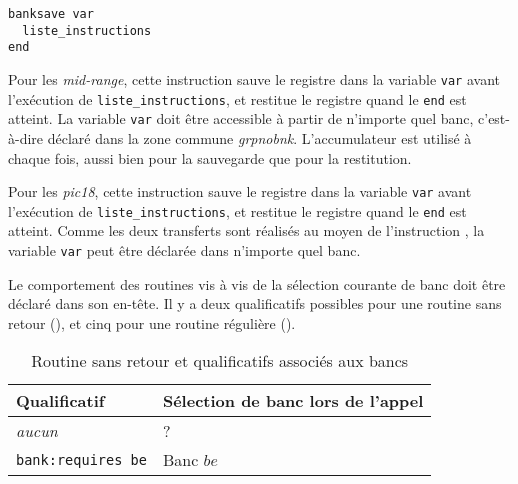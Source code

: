 
\begin{lstlisting}[language=piccolo]
banksave var
  liste_instructions
end
\end{lstlisting}

Pour les \emph{mid-range}, cette instruction sauve le registre  dans la variable \texttt{var} avant l'exécution de \texttt{liste\_instructions}, et restitue le registre  quand le \texttt{end} est atteint. La variable \texttt{var} doit être accessible à partir de n'importe quel banc, c'est-à-dire déclaré dans la zone commune \emph{grpnobnk}. L'accumulateur  est utilisé à chaque fois, aussi bien pour la sauvegarde que pour la restitution.

Pour les \emph{pic18}, cette instruction sauve le registre  dans la variable \texttt{var} avant l'exécution de \texttt{liste\_instructions}, et restitue le registre  quand le \texttt{end} est atteint. Comme les deux transferts sont réalisés au moyen de l'instruction , la variable \texttt{var} peut être déclarée dans n'importe quel banc.




Le comportement des routines vis à vis de la sélection courante de banc doit être déclaré dans son en-tête. Il y a deux qualificatifs possibles pour une routine sans retour (), et cinq pour une routine régulière ().



\begin{table}[!ht]
  \centering
  \begin{tabular}{ll}
    \textbf{Qualificatif} & \textbf{Sélection de banc lors de l'appel} \\
    \hline
    \emph{aucun} & ?\\ 
    \texttt{bank:requires be} & Banc $be$\\ 
    \hline
  \end{tabular}
  \caption{Routine sans retour et qualificatifs associés aux bancs}
\end{table}

